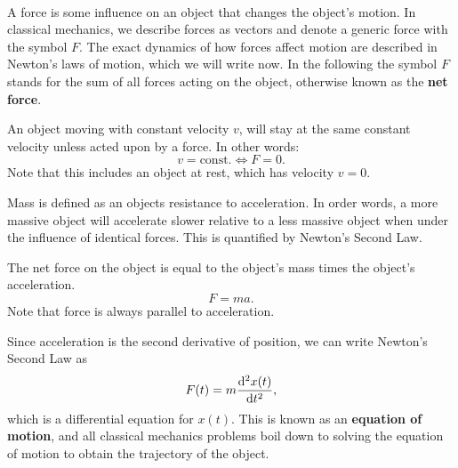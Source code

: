\documentclass[../classical_mechanics.tex]{subfiles}
\begin{document}
        \paragraph{}
        A force is some influence on an object that changes the object's motion.
        In classical mechanics, we describe forces as vectors and denote a generic force with the symbol $F$.
        The exact dynamics of how forces affect motion are described in Newton's laws of motion, which we will write now.
        In the following the symbol $F$ stands for the sum of all forces acting on the object, otherwise known as the \textbf{net force}.
        \begin{definition}
            An object moving with constant velocity $v$, will stay at the same constant velocity unless acted upon by a force.
            In other words:
            \begin{equation}
                v=\text{const.}\iff F=0.
            \end{equation}
            Note that this includes an object at rest, which has velocity $v=0$.
        \end{definition}
        Mass is defined as an objects resistance to acceleration.
        In order words, a more massive object will accelerate slower relative to a less massive object when under the influence of identical forces.
        This is quantified by Newton's Second Law.
        \begin{definition}
            The net force on the object is equal to the object's mass times the object's acceleration.
            \begin{equation}
                F=ma.
            \end{equation}
            Note that force is always parallel to acceleration.
        \end{definition}
        Since acceleration is the second derivative of position, we can write Newton's Second Law as
        \begin{equation}
            F(t)=m\dv[2]{x(t)}{t},
        \end{equation}
        which is a differential equation for $x(t)$.
        This is known as an \textbf{equation of motion}, and all classical mechanics problems boil down to solving the equation of motion to obtain the trajectory of the object.
\end{document}
